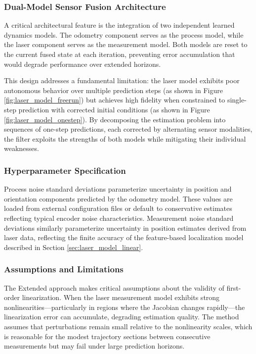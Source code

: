 \documentclass[conference]{IEEEtran}
\begin{document}
\subsubsection{Dual-Model Sensor Fusion Architecture}

A critical architectural feature is the integration of two independent learned dynamics models. The odometry component serves as the process model, while the laser component serves as the measurement model. Both models are reset to the current fused state at each iteration, preventing error accumulation that would degrade performance over extended horizons.

This design addresses a fundamental limitation: the laser model exhibits poor autonomous behavior over multiple prediction steps (as shown in Figure \ref{fig:laser_model_freerun}) but achieves high fidelity when constrained to single-step prediction with corrected initial conditions (as shown in Figure \ref{fig:laser_model_onestep}). By decomposing the estimation problem into sequences of one-step predictions, each corrected by alternating sensor modalities, the filter exploits the strengths of both models while mitigating their individual weaknesses.

\subsubsection{Hyperparameter Specification}

Process noise standard deviations parameterize uncertainty in position and orientation components predicted by the odometry model. These values are loaded from external configuration files or default to conservative estimates reflecting typical encoder noise characteristics. Measurement noise standard deviations similarly parameterize uncertainty in position estimates derived from laser data, reflecting the finite accuracy of the feature-based localization model described in Section \ref{sec:laser_model_linear}.

\subsubsection{Assumptions and Limitations}

The Extended approach makes critical assumptions about the validity of first-order linearization. When the laser measurement model exhibits strong nonlinearities—particularly in regions where the Jacobian changes rapidly—the linearization error can accumulate, degrading estimation quality. The method assumes that perturbations remain small relative to the nonlinearity scales, which is reasonable for the modest trajectory sections between consecutive measurements but may fail under large prediction horizons.
\end{document}
